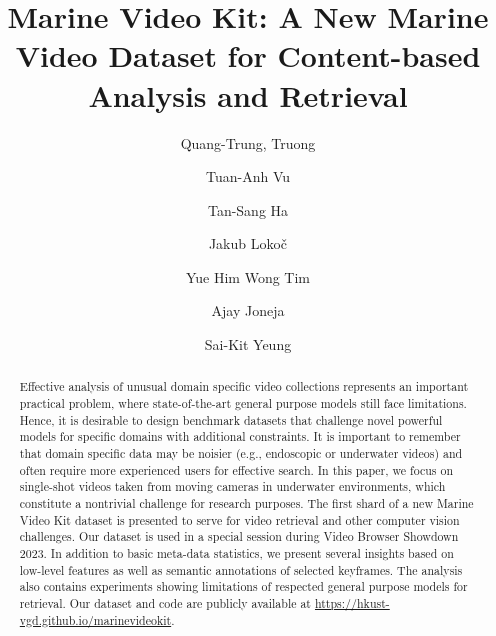 \documentclass[runningheads]{llncs}
\begin{document}
\pagestyle{headings}
\mainmatter
\def\MMMSubNumber{232}  


\title{Marine Video Kit: A New Marine Video Dataset for Content-based Analysis and Retrieval}
\begin{comment}
\titlerunning{MMM-23 submission ID \MMMSubNumber} 
\authorrunning{MMM-23 submission ID \MMMSubNumber} 
\author{Anonymous MMM submission}
\institute{Paper ID \MMMSubNumber}
\end{comment}




\author{Quang-Trung, Truong \and	
Tuan-Anh Vu \and	
Tan-Sang Ha \and	
Jakub Loko\v{c} \and	
Yue Him Wong Tim \and	
Ajay Joneja \and	
Sai-Kit Yeung	
}


\maketitle              \begin{abstract}
Effective analysis of unusual domain specific video collections represents an important practical problem, where state-of-the-art general purpose models still face limitations. Hence, it is desirable to design benchmark datasets that challenge novel powerful models for specific domains with additional constraints. It is important to remember that domain specific data may be noisier (e.g., endoscopic or underwater videos) and often require more experienced users for effective search. In this paper, we focus on single-shot videos taken from moving cameras in underwater environments, which constitute a nontrivial challenge for research purposes. The first shard of a new Marine Video Kit dataset is presented to serve for video retrieval and other computer vision challenges. Our dataset is used in a special session during Video Browser Showdown 2023. In addition to basic meta-data statistics, we present several insights based on low-level features as well as semantic annotations of selected keyframes. The analysis also contains experiments showing limitations of respected general purpose models for retrieval. Our dataset
and code are publicly available at \url{https://hkust-vgd.github.io/marinevideokit}.
 
\end{abstract}
\end{document}
